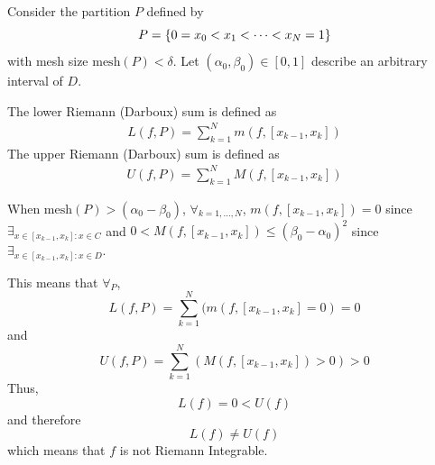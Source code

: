 \documentclass[]{article}
\begin{document}
Consider the partition $P$ defined by\[
    P = \qty{0 = x_0 < x_1 < \cdots < x_N = 1}
\] with mesh size $\text{mesh}(P) < \delta$. 
Let $(\alpha_0, \beta_0) \in [0,1]$ describe an arbitrary interval of $D$.

The lower Riemann (Darboux) sum is defined as \begin{align*}
    L(f,P) = \sum_{k=1}^{N} m(f, [x_{k-1}, x_k])
\end{align*} The upper Riemann (Darboux) sum is defined as \begin{align*}
    U(f,P) = \sum_{k=1}^{N} M(f, [x_{k-1}, x_k])
\end{align*}

When $\text{mesh}(P) > (\alpha_0 - \beta_0)$, $\forall_{k=1,\dots,N}$, $m(f, [x_{k-1}, x_{k}]) = 0$ since $\exists_{x \in [x_{k-1}, x_{k}] : x \in C}$ and $0 < M(f, [x_{k-1}, x_{k}]) \leq (\beta_0 - \alpha_0)^2$ since $\exists_{x \in [x_{k-1}, x_{k}] : x \in D}$.

This means that $\forall_{P}$, \[
    L(f,P) = \sum_{k=1}^{N} (m(f, [x_{k-1}, x_{k}] = 0) = 0
\] and \[
    U(f,P) = \sum_{k=1}^{N} (M(f, [x_{k-1}, x_{k}]) > 0) > 0
\] Thus, \[
    L(f) = 0 < U(f)
\] and therefore \[
    L(f) \neq U(f) 
\] which means that $f$ is not Riemann Integrable.
\end{document}
